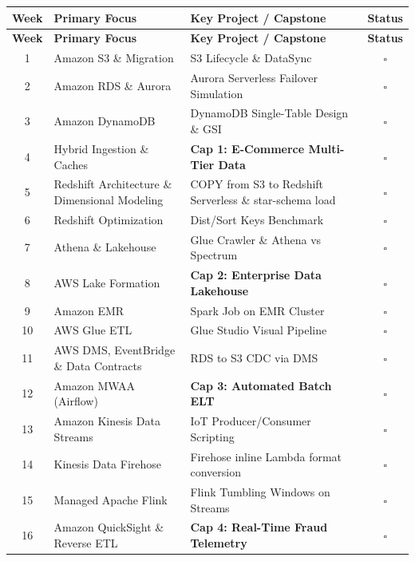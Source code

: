 \documentclass[11pt, a4paper]{article}
\begin{document}
\begin{center}
\renewcommand{\arraystretch}{1.5}
\begin{longtable}{@{} c l p{7cm} c @{}}
\toprule
\textbf{Week} & \textbf{Primary Focus} & \textbf{Key Project / Capstone} & \textbf{Status} \\ 
\midrule
\endfirsthead

\toprule
\textbf{Week} & \textbf{Primary Focus} & \textbf{Key Project / Capstone} & \textbf{Status} \\ 
\midrule
\endhead

\bottomrule
\endfoot

\bottomrule
\endlastfoot

1 & Amazon S3 \& Migration & S3 Lifecycle \& DataSync & $\square$ \\
2 & Amazon RDS \& Aurora & Aurora Serverless Failover Simulation & $\square$ \\
3 & Amazon DynamoDB & DynamoDB Single-Table Design \& GSI & $\square$ \\
4 & Hybrid Ingestion \& Caches & \textbf{Cap 1: E-Commerce Multi-Tier Data} & $\square$ \\
\midrule
5 & Redshift Architecture \& Dimensional Modeling & COPY from S3 to Redshift Serverless \& star-schema load & $\square$ \\
6 & Redshift Optimization & Dist/Sort Keys Benchmark & $\square$ \\
7 & Athena \& Lakehouse & Glue Crawler \& Athena vs Spectrum & $\square$ \\
8 & AWS Lake Formation & \textbf{Cap 2: Enterprise Data Lakehouse} & $\square$ \\
\midrule
9 & Amazon EMR & Spark Job on EMR Cluster & $\square$ \\
10 & AWS Glue ETL & Glue Studio Visual Pipeline & $\square$ \\
11 & AWS DMS, EventBridge \& Data Contracts & RDS to S3 CDC via DMS & $\square$ \\
12 & Amazon MWAA (Airflow) & \textbf{Cap 3: Automated Batch ELT} & $\square$ \\
\midrule
13 & Amazon Kinesis Data Streams & IoT Producer/Consumer Scripting & $\square$ \\
14 & Kinesis Data Firehose & Firehose inline Lambda format conversion & $\square$ \\
15 & Managed Apache Flink & Flink Tumbling Windows on Streams & $\square$ \\
16 & Amazon QuickSight \& Reverse ETL & \textbf{Cap 4: Real-Time Fraud Telemetry} & $\square$ \\

\end{longtable}
\end{center}
\end{document}

